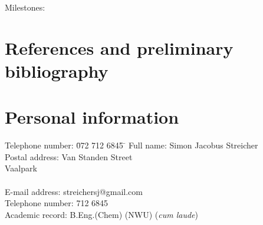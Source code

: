 \documentclass{article}
\begin{document}
Milestones:







\section{References and preliminary bibliography}




\section*{Personal information}

\begin{tabbing}
  Telephone number: \= 072 712 6845 \= \kill
  Full name: \> Simon Jacobus Streicher \\[2ex]
  Postal address:  Van Standen Street \\ \> Vaalpark \\  \\[2ex] 
  E-mail address: \> streichersj@gmail.com \\[2ex]
  Telephone number:  712 6845 \\[2ex]
  Academic record: \> B.Eng.(Chem) (NWU) (\textit{cum laude})
\end{tabbing}
\end{document}
